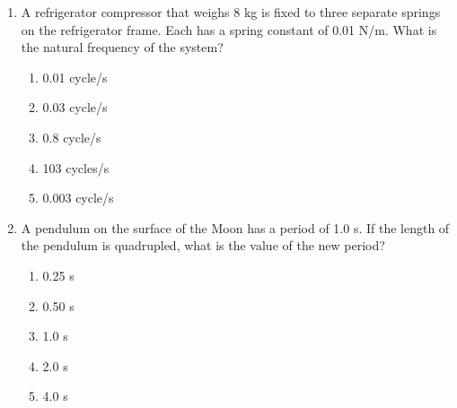 \documentclass{../../../oss-apphys}
\begin{document}
\begin{multicols}{2}
\begin{enumerate}[leftmargin=18pt]
  \item A refrigerator compressor that weighs 8 kg is fixed to three separate
    springs on the refrigerator frame. Each has a spring constant of 0.01
    N/m. What is the natural frequency of the system?
    \begin{enumerate}[nosep,leftmargin=18pt,label=(\Alph*)]
    \item 0.01 cycle/s
    \item 0.03 cycle/s
    \item 0.8 cycle/s
    \item 103 cycles/s
    \item 0.003 cycle/s
    \end{enumerate}
    \columnbreak
    
    
  \item A pendulum on the surface of the Moon has a period of 1.0 s. If the
    length of the pendulum is quadrupled, what is the value of the new
    period?
    \begin{enumerate}[nosep,leftmargin=18pt,label=(\Alph*)]
    \item 0.25 s
    \item 0.50 s
    \item 1.0 s
    \item 2.0 s
    \item 4.0 s
    \end{enumerate}
    

\end{enumerate}
\end{multicols}
\end{document}
